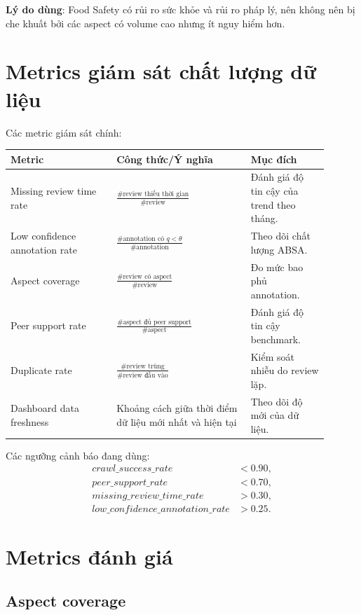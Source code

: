 \documentclass[12pt,a4paper]{article}
\begin{document}
\textbf{Lý do dùng}: Food Safety có rủi ro sức khỏe và rủi ro pháp lý, nên không nên bị che khuất bởi các aspect có volume cao nhưng ít nguy hiểm hơn.

\section{Metrics giám sát chất lượng dữ liệu}

Các metric giám sát chính:

\begin{longtable}{p{0.30\linewidth}p{0.38\linewidth}p{0.22\linewidth}}
\toprule
\textbf{Metric} & \textbf{Công thức/Ý nghĩa} & \textbf{Mục đích}\\
\midrule
Missing review time rate &
$\frac{\#\text{review thiếu thời gian}}{\#\text{review}}$ &
Đánh giá độ tin cậy của trend theo tháng.\\
Low confidence annotation rate &
$\frac{\#\text{annotation có }q<\theta}{\#\text{annotation}}$ &
Theo dõi chất lượng ABSA.\\
Aspect coverage &
$\frac{\#\text{review có aspect}}{\#\text{review}}$ &
Đo mức bao phủ annotation.\\
Peer support rate &
$\frac{\#\text{aspect đủ peer support}}{\#\text{aspect}}$ &
Đánh giá độ tin cậy benchmark.\\
Duplicate rate &
$\frac{\#\text{review trùng}}{\#\text{review đầu vào}}$ &
Kiểm soát nhiễu do review lặp.\\
Dashboard data freshness &
Khoảng cách giữa thời điểm dữ liệu mới nhất và hiện tại &
Theo dõi độ mới của dữ liệu.\\
\bottomrule
\end{longtable}

Các ngưỡng cảnh báo đang dùng:
\begin{align}
crawl\_success\_rate &< 0.90,\\
peer\_support\_rate &< 0.70,\\
missing\_review\_time\_rate &> 0.30,\\
low\_confidence\_annotation\_rate &> 0.25.
\end{align}

\section{Metrics đánh giá}

\subsection{Aspect coverage}
\end{document}

